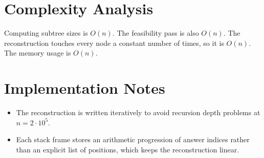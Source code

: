 \documentclass[11pt]{article}
\begin{document}
\section*{Complexity Analysis}

Computing subtree sizes is $O(n)$. The feasibility pass is also $O(n)$. The reconstruction touches every
node a constant number of times, so it is $O(n)$. The memory usage is $O(n)$.

\section*{Implementation Notes}

\begin{itemize}[leftmargin=*]
    \item The reconstruction is written iteratively to avoid recursion depth problems at $n=2\cdot 10^5$.
    \item Each stack frame stores an arithmetic progression of answer indices rather than an explicit list of
    positions, which keeps the reconstruction linear.
\end{itemize}
\end{document}
